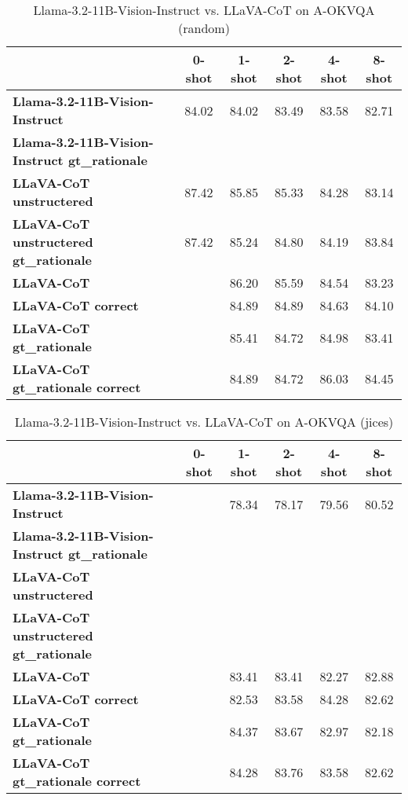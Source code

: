 \begin{table}
\caption{Llama-3.2-11B-Vision-Instruct vs. LLaVA-CoT on A-OKVQA (random)}
\label{tab:Llama-3.2-11B-Vision-Instruct_A-OKVQA_TRAIN_random}
\begin{tabular}{lccccc}
\toprule
 & 0-shot & 1-shot & 2-shot & 4-shot & 8-shot \\
\midrule
\textbf{Llama-3.2-11B-Vision-Instruct} & 84.02 & 84.02 & 83.49 & 83.58 & 82.71 \\
\textbf{Llama-3.2-11B-Vision-Instruct gt\_rationale} &  &  &  &  &  \\
\textbf{LLaVA-CoT unstructered} & 87.42 & 85.85 & 85.33 & 84.28 & 83.14 \\
\textbf{LLaVA-CoT unstructered gt\_rationale} & 87.42 & 85.24 & 84.80 & 84.19 & 83.84 \\
\textbf{LLaVA-CoT} &  & 86.20 & 85.59 & 84.54 & 83.23 \\
\textbf{LLaVA-CoT correct} &  & 84.89 & 84.89 & 84.63 & 84.10 \\
\textbf{LLaVA-CoT gt\_rationale} &  & 85.41 & 84.72 & 84.98 & 83.41 \\
\textbf{LLaVA-CoT gt\_rationale correct} &  & 84.89 & 84.72 & 86.03 & 84.45 \\
\bottomrule
\end{tabular}
\end{table}


\begin{table}
\caption{Llama-3.2-11B-Vision-Instruct vs. LLaVA-CoT on A-OKVQA (jices)}
\label{tab:Llama-3.2-11B-Vision-Instruct_A-OKVQA_TRAIN_jices}
\begin{tabular}{lccccc}
\toprule
 & 0-shot & 1-shot & 2-shot & 4-shot & 8-shot \\
\midrule
\textbf{Llama-3.2-11B-Vision-Instruct} &  & 78.34 & 78.17 & 79.56 & 80.52 \\
\textbf{Llama-3.2-11B-Vision-Instruct gt\_rationale} &  &  &  &  &  \\
\textbf{LLaVA-CoT unstructered} &  &  &  &  &  \\
\textbf{LLaVA-CoT unstructered gt\_rationale} &  &  &  &  &  \\
\textbf{LLaVA-CoT} &  & 83.41 & 83.41 & 82.27 & 82.88 \\
\textbf{LLaVA-CoT correct} &  & 82.53 & 83.58 & 84.28 & 82.62 \\
\textbf{LLaVA-CoT gt\_rationale} &  & 84.37 & 83.67 & 82.97 & 82.18 \\
\textbf{LLaVA-CoT gt\_rationale correct} &  & 84.28 & 83.76 & 83.58 & 82.62 \\
\bottomrule
\end{tabular}
\end{table}


